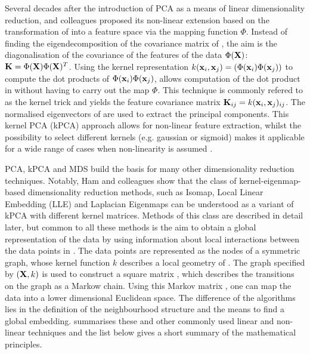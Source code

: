 Several decades after the introduction of PCA as a means of linear dimensionality reduction, \citet{Schoelkopf1998} and colleagues proposed its non-linear extension based on the transformation of  into a feature space  via the mapping function  \(\Phi\). Instead of finding the eigendecomposition of the covariance matrix of , the aim is the diagonalisation of the covariance  of the features of the data \(\Phi(\boldsymbol{\mathbf{X}})\): \(\boldsymbol{\mathbf{K}} = \Phi(\boldsymbol{\mathbf{X}})\Phi(\boldsymbol{\mathbf{X}})^T\). Using the kernel representation \(k(\boldsymbol{\mathbf{x}}_{i}, \boldsymbol{\mathbf{x}}_{j}) = (\Phi(\boldsymbol{\mathbf{x}}_{i})\Phi(\boldsymbol{\mathbf{x}}_{j}))\) to compute the dot products of \(\Phi(\boldsymbol{\mathbf{x}}_{i})\Phi(\boldsymbol{\mathbf{x}}_{j})\), allows computation of the dot product in  without having to carry out the map \(\Phi\). This technique is commonly refered to as the kernel trick and yields the feature covariance matrix \(\boldsymbol{\mathbf{K}}_{ij} = k(\boldsymbol{\mathbf{x}}_{i}, \boldsymbol{\mathbf{x}}_{j})_{ij}\). The normalised eigenvectors of  are used to extract the principal components. This kernel PCA (kPCA) approach allows for non-linear feature extraction, whilst the possibility to select different kernels (e.g. gaussian or sigmoid) makes it applicable for a wide range of cases when non-linearity is assumed \citep{Schoelkopf1998}.

PCA, kPCA and MDS build the basis for many other dimensionality reduction techniques. Notably, Ham and colleagues show that the class of kernel-eigenmap-based dimensionality reduction methods, such as Isomap, Local Linear Embedding (LLE) and Laplacian Eigenmaps can be understood as a variant of kPCA with different kernel matrices. Methods of this class are described in detail later, but common to all these methods is the aim to obtain a global representation of the data  by using information about local interactions between the data points in . The data points are represented as the nodes of a symmetric graph, whose kernel function \(k\) describes a local geometry of . The graph specified by \((\boldsymbol{\mathbf{X}}, k)\) is used to construct a square matrix , which describes the transitions on the graph as a Markow chain. Using this Markov matrix , one can map the data into a lower dimensional Euclidean space. The difference of the algorithms lies in the definition of the neighbourhood structure and the means to find a global embedding.  summarises these and other commonly used linear and non-linear techniques and the list below gives a short summary of the mathematical principles. 

